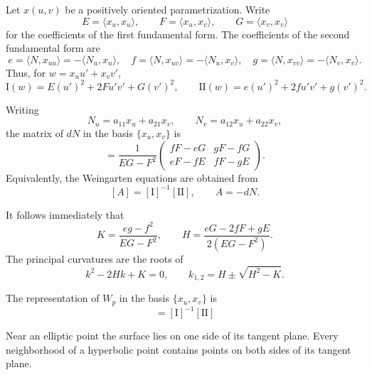 \documentclass[12pt, oneside]{book}
\begin{document}
Let $x(u,v)$ be a positively oriented parametrization.  Write
\[
    E=\langle x_u,x_u\rangle,
    \qquad F=\langle x_u,x_v\rangle,
    \qquad G=\langle x_v,x_v\rangle
\]
for the coefficients of the first fundamental form.  The coefficients of the
second fundamental form are
\[
    e=\langle N,x_{uu}\rangle=-\langle N_u,x_u\rangle,
    \quad
    f=\langle N,x_{uv}\rangle=-\langle N_u,x_v\rangle,
    \quad
    g=\langle N,x_{vv}\rangle=-\langle N_v,x_v\rangle.
\]
Thus, for $w=x_u u'+x_v v'$,
\begin{equation}
    \mathrm{I}(w)=E(u')^2+2Fu'v'+G(v')^2,
    \qquad
    \mathrm{II}(w)=e(u')^2+2fu'v'+g(v')^2.
    \label{eq:fundamental-forms}
\end{equation}

Writing
\[
    N_u=a_{11}x_u+a_{21}x_v,
    \qquad
    N_v=a_{12}x_u+a_{22}x_v,
\]
the matrix of $dN$ in the basis $\{x_u,x_v\}$ is
\begin{equation}
    [dN]=\frac{1}{EG-F^2}
    \begin{pmatrix}
        fF-eG & gF-fG \\
        eF-fE & fF-gE
    \end{pmatrix}.
    \label{eq:weingarten-matrix}
\end{equation}
Equivalently, the Weingarten equations are obtained from
\[
    [A]=[\mathrm{I}]^{-1}[\mathrm{II}],
    \qquad A=-dN.
\]

It follows immediately that
\begin{equation}
    K=\frac{eg-f^2}{EG-F^2},
    \qquad
    H=\frac{eG-2fF+gE}{2(EG-F^2)}.
    \label{eq:KH-local}
\end{equation}
The principal curvatures are the roots of
\[
    k^2-2Hk+K=0,
    \qquad
    k_{1,2}=H\pm\sqrt{H^2-K}.
\]


\begin{proposition}
    The representation of $W_p$ in the basis $\{x_u,x_v\}$ is
    \begin{equation*}
        [W]=[\mathrm{I}]^{-1}[\mathrm{II}]
    \end{equation*}
\end{proposition}



\begin{proposition}
    Near an elliptic point the surface lies on one side of its tangent plane.
    Every neighborhood of a hyperbolic point contains points on both sides of
    its tangent plane.
\end{proposition}
\end{document}
